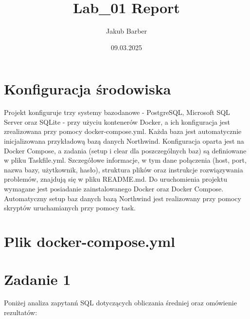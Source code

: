 \documentclass{article}
\title{Lab\_01 Report}
\author{Jakub Barber}
\date{09.03.2025}
\begin{document}
\maketitle

\section*{Konfiguracja środowiska}
Projekt konfiguruje trzy systemy bazodanowe - PostgreSQL, Microsoft SQL Server oraz SQLite - przy użyciu kontenerów Docker,
 a ich konfiguracja jest zrealizowana przy pomocy docker-compose.yml.
Każda baza jest automatycznie inicjalizowana przykładową bazą danych Northwind.
Konfiguracja oparta jest na Docker Compose, a zadania (setup i clear dla poszczególnych baz) są definiowane w pliku Taskfile.yml.
Szczegółowe informacje, w tym dane połączenia (host, port, nazwa bazy, użytkownik, hasło), struktura plików oraz instrukcje rozwiązywania problemów, znajdują się w pliku README.md.
Do uruchomienia projektu wymagane jest posiadanie zainstalowanego Docker oraz Docker Compose. Automatyczny setup baz danych bazą Northwind
jest realizowany przy pomocy skryptów uruchamianych przy pomocy task.

\section*{Plik docker-compose.yml}


\section*{Zadanie 1}

Poniżej analiza zapytanń SQL dotyczących obliczania średniej oraz omówienie rezultatów:
\end{document}

